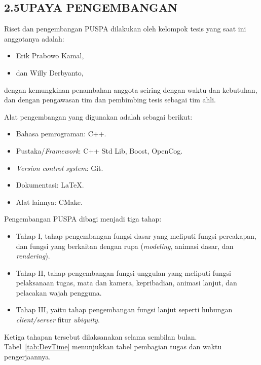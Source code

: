 \subsection*{\textsf{\normalsize 2.5\hspace{0.5cm}UPAYA PENGEMBANGAN}}

Riset dan pengembangan PUSPA dilakukan oleh kelompok tesis yang saat ini anggotanya adalah:
\begin{itemize}
\item Erik Prabowo Kamal,
\item dan Willy Derbyanto,
\end{itemize}
dengan kemungkinan penambahan anggota seiring dengan waktu dan kebutuhan, dan dengan pengawasan tim dan pembimbing tesis sebagai tim ahli.

Alat pengembangan yang digunakan adalah sebagai berikut:
\begin{itemize}
	\item Bahasa pemrograman: C++.
	\item Pustaka/\textit{Framework}: C++ Std Lib, Boost, OpenCog.
	\item \textit{Version control system}: Git.
	\item Dokumentasi: \LaTeX.
	\item Alat lainnya: CMake.
\end{itemize}

Pengembangan PUSPA dibagi menjadi tiga tahap:
\begin{itemize}
	\item Tahap I, tahap pengembangan fungsi dasar yang meliputi fungsi percakapan, dan fungsi yang berkaitan dengan rupa (\textit{modeling}, animasi dasar, dan \textit{rendering}).
	\item Tahap II, tahap pengembangan fungsi unggulan yang meliputi fungsi pelaksanaan tugas, mata dan kamera, kepribadian, animasi lanjut, dan pelacakan wajah pengguna.
	\item Tahap III, yaitu tahap pengembangan fungsi lanjut seperti hubungan \textit{client/server} fitur \textit{ubiquity}.
\end{itemize}
Ketiga tahapan tersebut dilaksanakan selama sembilan bulan. Tabel~\ref{tab:DevTime} menunjukkan tabel pembagian tugas dan waktu pengerjaannya.

